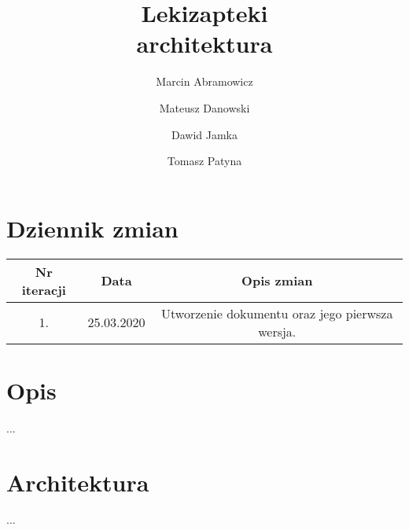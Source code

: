 \documentclass{article}
\title{
Lekizapteki\\
\large architektura}
\author{Marcin Abramowicz \and Mateusz Danowski \and Dawid Jamka \and Tomasz Patyna}
\begin{document}
  \maketitle

  \section{Dziennik zmian}
  \begin{tabular}{|c|c|c|}
    Nr iteracji & Data & Opis zmian \\
    \hline
    1. & 25.03.2020 & Utworzenie dokumentu oraz jego pierwsza wersja. \\
  \end{tabular}

  \section{Opis}
  ...

  \section{Architektura}
  ...
\end{document}
